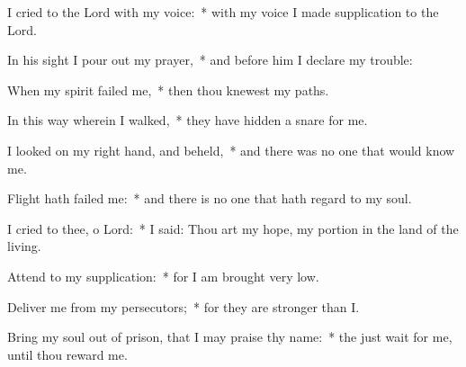 \begin{enpars}
\item I cried to the Lord with my voice:~* with my voice I made supplication to the Lord.
\item In his sight I pour out my prayer,~* and before him I declare my trouble:
\item When my spirit failed me,~* then thou knewest my paths.
\item In this way wherein I walked,~* they have hidden a snare for me.
\item I looked on my right hand, and beheld,~* and there was no one that would know me.
\item Flight hath failed me:~* and there is no one that hath regard to my soul.
\item I cried to thee, o Lord:~* I said: Thou art my hope, my portion in the land of the living.
\item Attend to my supplication:~* for I am brought very low.
\item Deliver me from my persecutors;~* for they are stronger than I.
\item Bring my soul out of prison, that I may praise thy name:~* the just wait for me, until thou reward me.
\end{enpars}